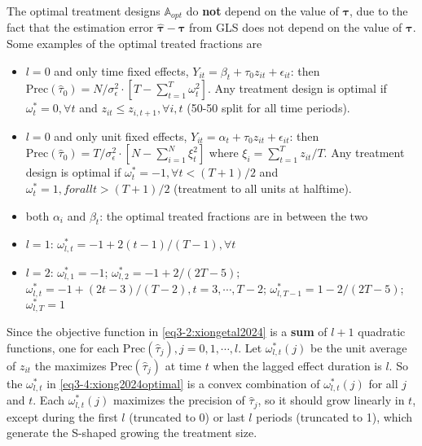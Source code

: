\documentclass[twoside]{article}
\begin{document}
The optimal treatment designs $\mathbb{A}_{opt}$ do \textbf{not} depend on the value of $\boldsymbol{\tau}$, due to the fact that the estimation error $\hat{\boldsymbol{\tau}}-\boldsymbol{\tau}$ from GLS does not depend on the value of $\boldsymbol{\tau}$. Some examples of the optimal treated fractions are 
\begin{itemize}
    \item $l=0$ and only time fixed effects, $Y_{it}=\beta_t+\tau_0z_{it}+\epsilon_{it}$: then $\mathrm{Prec}\left(\hat{\tau}_0\right) = N/\sigma^2_{\epsilon} \cdot \left[T-\sum^T_{t=1}\omega^2_t\right] $. Any treatment design is optimal if $\omega^*_t=0,\forall t$ and $z_{it}\leq z_{i,t+1},\forall i,t$ (50-50 split for all time periods).
    \item $l=0$ and only unit fixed effects, $Y_{it}=\alpha_t+\tau_0z_{it}+\epsilon_{it}$: then $\mathrm{Prec}\left(\hat{\tau}_0\right) = T/\sigma^2_{\epsilon} \cdot \left[N-\sum^N_{i=1}\xi^2_t\right] $ where $\xi_i=\sum^T_{t=1}z_{it}/T$. Any treatment design is optimal if $\omega^*_t=-1,\forall t<(T+1)/2$ and $\omega^*_t=1,forall t>(T+1)/2$ (treatment to all units at halftime).
    \item both $\alpha_i$ and $\beta_t$: the optimal treated fractions are in between the two
    \item $l=1$: $\omega^*_{l,t} = -1+2(t-1)/(T-1),\forall t$ 
    \item $l=2$: $\omega^*_{l,1}=-1$; $\omega^*_{l,2}=-1+2/(2T-5)$; $\omega^*_{l,t}=-1+(2t-3)/(T-2),t=3,\cdots,T-2$; $\omega^*_{l,T-1}=1-2/(2T-5)$; $\omega^*_{l,T}=1$
\end{itemize}

Since the objective function in \ref{eq3-2:xiongetal2024} is a \textbf{sum} of $l+1$ quadratic functions, one for each $\mathrm{Prec}\left(\hat{\tau}_j\right),j=0,1,\cdots,l$. Let $\omega^*_{l,t}(j)$ be the unit average of $z_{it}$ the maximizes $\mathrm{Prec}\left(\hat{\tau}_j\right)$ at time $t$ when the lagged effect duration is $l$.
So the $\omega^*_{l,t}$ in \ref{eq3-4:xiong2024optimal} is a convex combination of $\omega^*_{l,t}(j)$ for all $j$ and $t$. Each $\omega^*_{l,t}(j)$ maximizes the precision of $\hat{\tau}_j$, so it should grow linearly in $t$, except during the first $l$  (truncated to 0) or last $l$ periods (truncated to 1), which generate the S-shaped growing the treatment size.
\end{document}
